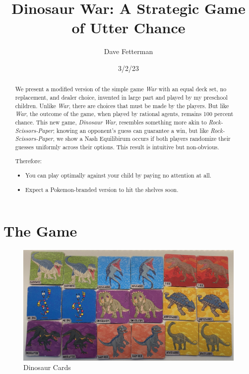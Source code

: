 \documentclass[11pt, oneside]{article} 	%
\title{Dinosaur War: A Strategic Game of Utter Chance}
\author{Dave Fetterman}
\affil{Obviously Unemployed}
\date{3/2/23}
\begin{document}
\maketitle

\begin{abstract}

We present a modified version of the simple game \emph{War} with an equal deck set, no replacement, and dealer choice, invented in large part and played by my preschool children.  Unlike  \emph{War}, there are choices that must be made by the players.  But like  \emph{War}, the outcome of the game, when played by rational agents, remains 100 percent chance.  This new game, \emph{Dinosaur War}, resembles something more akin to \emph{Rock-Scissors-Paper}; knowing an opponent's guess can guarantee a win, but like  \emph{Rock-Scissors-Paper}, we show a Nash Equilibirum occurs if both players randomize their guesses uniformly across their options.  This result is intuitive but non-obvious.

Therefore:
\begin{itemize}
\item You can play optimally against your child by paying no attention at all.
\item Expect a Pokemon-branded version to hit the shelves soon.
\end{itemize}

\end{abstract}

\section{The Game}


\begin{figure}
\centering
\includegraphics[scale=.3]{cards}
\caption{Dinosaur Cards}
\end{figure}
\end{document}
